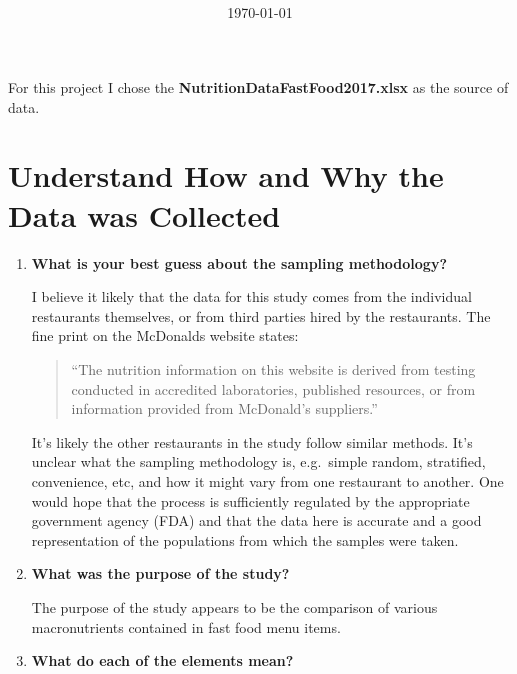 \documentclass[12pt,fleqn]{article}
\title{\classdescription\ \\ \classname\ \\ $\ $ \\ \assignment}
\author{\authorname}
\date{\today}
\begin{document}
\maketitle

For this project I chose the \textbf{NutritionDataFastFood2017.xlsx} as the source of data.

\section{Understand How and Why the Data was Collected}
\begin{enumerate}
\item \textbf{What is your best guess about the sampling methodology?}

  I believe it likely that the data for this study comes from the individual restaurants themselves, or from third parties hired by the restaurants. The fine print on the McDonalds website states:
  \begin{quote}
    \begin{footnotesize}
    ``The nutrition information on this website is derived from testing conducted in accredited laboratories, published resources, or from information provided from McDonald's suppliers.''
    \end{footnotesize}
  \end{quote}
  It's likely the other restaurants in the study follow similar methods. It's unclear what the sampling methodology is, e.g.~simple random, stratified, convenience, etc, and how it might vary from one restaurant to another. One would hope that the process is sufficiently regulated by the appropriate government agency (FDA) and that the data here is accurate and a good representation of the populations from which the samples were taken.

\item \textbf{What was the purpose of the study?}

  The purpose of the study appears to be the comparison of various macronutrients contained in fast food menu items.

\pagebreak
\item \textbf{What do each of the elements mean?}


\end{enumerate}
\end{document}
